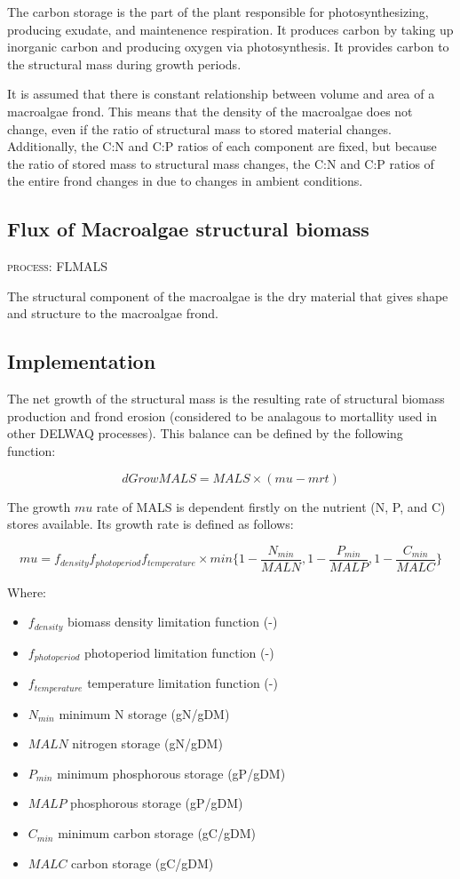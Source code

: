 \documentclass{article}
\begin{document}
The carbon storage is the part of the plant responsible for photosynthesizing, producing exudate, and maintenence respiration. It produces carbon by taking up inorganic carbon and producing oxygen via photosynthesis. It provides carbon to the structural mass during growth periods. 

It is assumed that there is constant relationship between volume and area of a macroalgae frond. This means that the density of the macroalgae does not change, even if the ratio of structural mass to stored material changes. Additionally, the C:N and C:P ratios of each component are fixed, but because the ratio of stored mass to structural mass changes, the C:N and C:P ratios of the entire frond changes in due to changes in ambient conditions.

\subsection{Flux of Macroalgae structural biomass}
\begin{flushright}
\textsc{process: FLMALS}
\end{flushright}

The structural component of the macroalgae is the dry material that gives shape and structure to the macroalgae frond. 

\subsection{Implementation} 
The net growth of the structural mass is the resulting rate of structural biomass production and frond erosion (considered to be analagous to mortallity used in other DELWAQ processes). This balance can be defined by the following function:

\[dGrowMALS =MALS \times (mu - mrt)\]
 
The growth $mu$ rate of MALS is dependent firstly on the nutrient (N, P, and C) stores available. Its growth rate is defined as follows:

\[mu = f_{density} f_{photoperiod} f_{temperature}\times min\big\{1-\frac{N_{min}}{MALN},1-\frac{P_{min}}{MALP},1-\frac{C_{min}}{MALC}\big\}\]

Where:
\begin{itemize}
\item $f_{density}$ biomass density limitation function (-)
\item $f_{photoperiod}$ photoperiod limitation function (-)
\item $f_{temperature}$ temperature limitation function (-)
\item $N_{min}$ minimum N storage (gN/gDM)
\item $MALN$ nitrogen storage (gN/gDM)
\item $P_{min}$ minimum phosphorous storage (gP/gDM)
\item $MALP$ phosphorous storage (gP/gDM)
\item $C_{min}$ minimum carbon storage (gC/gDM)
\item $MALC$ carbon storage (gC/gDM)
\end{itemize}
\end{document}
